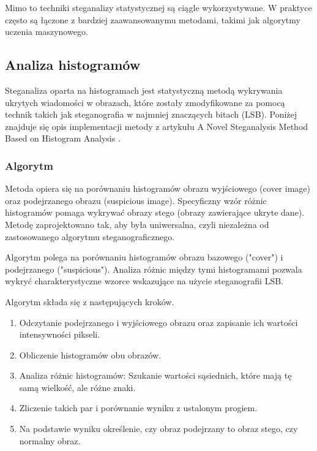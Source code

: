 Mimo to techniki steganalizy statystycznej są ciągle wykorzystywane. W praktyce często są łączone z bardziej 
zaawansowanymu metodami, takimi jak algorytmy uczenia maszynowego. 

\subsection{Analiza histogramów}
Steganaliza oparta na histogramach jest statystyczną metodą wykrywania ukrytych wiadomości w obrazach, 
które zostały zmodyfikowane za pomocą technik takich jak steganografia w najmniej znaczących bitach (LSB). 
Poniżej znajduje się opis implementacji metody z artykułu A Novel Steganalysis Method Based
on Histogram Analysis \cite{}.

\subsubsection{Algorytm}
Metoda opiera się na porównaniu histogramów obrazu wyjściowego (cover image) oraz podejrzanego obrazu 
(suspicious image). Specyficzny wzór różnic histogramów pomaga wykrywać obrazy stego (obrazy zawierające 
ukryte dane). Metodę zaprojektowano tak, aby była uniwersalna, czyli niezależna od zastosowanego algorytmu 
steganograficznego.

Algorytm polega na porównaniu histogramów obrazu bazowego ("cover") i podejrzanego ("suspicious"). 
Analiza różnic między tymi histogramami pozwala wykryć charakterystyczne wzorce wskazujące na użycie 
steganografii LSB.

Algorytm składa się z następujących kroków.
\begin{enumerate}
    \item Odczytanie podejrzanego i wyjściowego obrazu oraz zapisanie ich wartości intensywności pikseli.
    \item Obliczenie histogramów obu obrazów.
    \item Analiza różnic histogramów: Szukanie wartości sąsiednich, które mają tę samą wielkość, ale różne 
    znaki.
    \item Zliczenie takich par i porównanie wyniku z ustalonym progiem.
    \item Na podstawie wyniku określenie, czy obraz podejrzany to obraz stego, czy normalny obraz.
\end{enumerate}

